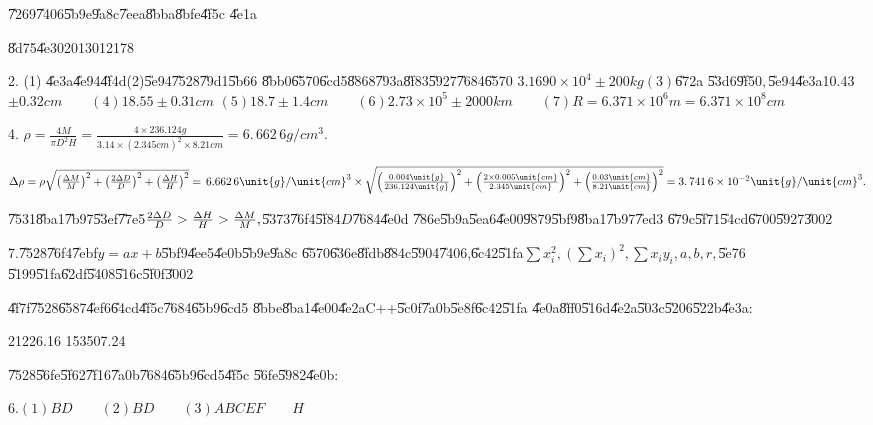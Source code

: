 \documentclass{article}
\begin{document}
\bigskip \U{7269}\U{7406}\U{5b9e}\U{9a8c}\U{7eea}\U{8bba}\U{8bfe}\U{4f5c}%
\U{4e1a}

\U{8d75}\U{4e30}2013012178

2. (1) \U{4e3a}\U{4e94}\U{4f4d}\qquad (2)\U{5e94}\U{7528}\U{79d1}\U{5b66}%
\U{8bb0}\U{6570}\U{6cd5}\U{8868}\U{793a}\U{8f83}\U{5927}\U{7684}\U{6570}%
\qquad $3.1690\times 10^{4}\pm 200\unit{kg}$\qquad $\left( 3\right) $\U{672a}%
\U{53d6}\U{9f50}$,$\U{5e94}\U{4e3a}10.43$\pm 0.32\unit{cm}\qquad \left(
4\right) 18.55\pm 0.31\unit{cm}$ \qquad $\left( 5\right) 18.7\pm 1.4\unit{cm}%
\qquad \left( 6\right) 2.73\times 10^{5}\pm 2000\unit{km}\qquad \left(
7\right) R=6.371\times 10^{6}\unit{m}=6.371\times 10^{8}\unit{cm}$

4. $\rho =\frac{4M}{\pi D^{2}H}=\frac{4\times 236.124\unit{g}}{3.14\times
\left( 2.345\unit{cm}\right) ^{2}\times 8.21\unit{cm}}=\allowbreak
6.\,\allowbreak 662\,6\unit{g}/\unit{cm}^{3}.$

$\Delta \rho =\rho \sqrt{\left( \frac{\Delta M}{M}\right) ^{2}+\left( \frac{%
2\Delta D}{D}\right) ^{2}+\left( \frac{\Delta H}{H}\right) ^{2}}%
=\,\allowbreak 6.662\,6\unit{g}/\unit{cm}^{3}\times \sqrt{\left( \frac{0.004%
\unit{g}}{236.124\unit{g}}\right) ^{2}+\left( \frac{2\times 0.005\unit{cm}}{%
2.345\unit{cm}}\right) ^{2}+\left( \frac{0.03\unit{cm}}{8.21\unit{cm}}%
\right) ^{2}}=3.\,\allowbreak 741\,6\times 10^{-2}\unit{g}/\unit{cm}^{3}.$

\U{7531}\U{8ba1}\U{7b97}\U{53ef}\U{77e5}\qquad $\frac{2\Delta D}{D}>\frac{%
\Delta H}{H}>\frac{\Delta M}{M},$\U{5373}\U{76f4}\U{5f84}$D$\U{7684}\U{4e0d}%
\U{786e}\U{5b9a}\U{5ea6}\U{4e00}\U{9879}\U{5bf9}\U{8ba1}\U{7b97}\U{7ed3}%
\U{679c}\U{5f71}\U{54cd}\U{6700}\U{5927}\U{3002}

7.\U{7528}\U{76f4}\U{7ebf}$y=ax+b$\U{5bf9}\U{4ee5}\U{4e0b}\U{5b9e}\U{9a8c}%
\U{6570}\U{636e}\U{8fdb}\U{884c}\U{5904}\U{7406},\U{6c42}\U{51fa}$\sum
x_{i}^{2},\left( \sum x_{i}\right) ^{2},\sum x_{i}y_{i},a,b,r,$\U{5e76}%
\U{5199}\U{51fa}\U{62df}\U{5408}\U{516c}\U{5f0f}\U{3002}

\U{4f7f}\U{7528}\U{6587}\U{4ef6}\U{64cd}\U{4f5c}\U{7684}\U{65b9}\U{6cd5}%
\U{8bbe}\U{8ba1}\U{4e00}\U{4e2a}C++\U{5c0f}\U{7a0b}\U{5e8f}\U{6c42}\U{51fa}%
\U{4e0a}\U{8ff0}\U{516d}\U{4e2a}\U{503c}\U{5206}\U{522b}\U{4e3a}:

21226.16 153507.24    

\U{7528}\U{56fe}\U{5f62}\U{7f16}\U{7a0b}\U{7684}\U{65b9}\U{6cd5}\U{4f5c}%
\U{56fe}\U{5982}\U{4e0b}:


6.\qquad $\left( 1\right) BD\qquad \left( 2\right) BD\qquad \left( 3\right)
ABCEF\qquad H$
\end{document}
